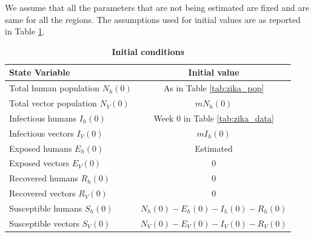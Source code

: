 \documentclass[10pt,letterpaper]{article}
\begin{document}
We assume that all the parameters that are not being estimated are fixed and are same for all the regions. The assumptions used for initial values are as reported in Table \ref{tab:zika_init}.

\begin{table}[]
    \centering
     \caption{\textbf{Initial conditions}}
    \begin{tabular}{lc}\hline
        State Variable & Initial value  \\\hline
        Total human population $N_h(0)$    & As in Table \ref{tab:zika_pop} \\
        Total vector population $N_V(0)$ & $mN_h(0)$\\
        Infectious humans $I_h(0)$ & Week 0 in Table \ref{tab:zika_data}\\
        Infectious vectors $I_V(0)$ & $mI_h(0)$\\
        Exposed humans $E_h(0)$ & Estimated \\
        Exposed vectors $E_V(0)$ & 0\\
        Recovered humans $R_h(0)$ & 0\\
        Recovered vectors $R_V(0)$ & 0\\
        Susceptible humans $S_h(0)$ & $N_h(0) - E_h(0) - I_h(0) - R_h(0)$\\
        Susceptible vectors $S_V(0)$ & $N_V(0) - E_V(0) - I_V(0) - R_V(0)$\\\hline
    \end{tabular}
   
    \label{tab:zika_init}
\end{table}
\end{document}
